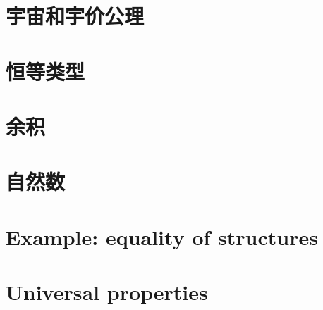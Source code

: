 \section{宇宙和宇价公理}
\label{sec:compute-universe}


\section{恒等类型}
\label{sec:compute-paths}


\section{余积}
\label{sec:compute-coprod}


\section{自然数}
\label{sec:compute-nat}


\section{Example: equality of structures}
\label{sec:equality-of-structures}


\section{Universal properties}
\label{sec:universal-properties}






